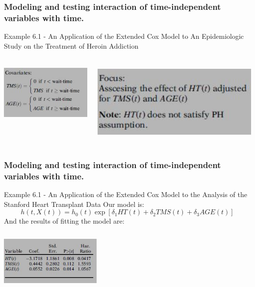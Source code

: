 \documentclass{beamer}
\theoremstyle{definition}
\begin{document}
\begin{frame}
\frametitle{Modeling and testing interaction of time-independent variables with time.}
\begin{block}{Example 6.1 - An Application of the Extended Cox Model to An Epidemiologic Study on the Treatment of Heroin Addiction}
\begin{columns}
    \begin{column}{0.48\textwidth}
        \includegraphics[width =\textwidth, height=3cm]{CH6_transp2.JPG}
    \end{column}
    \hspace{-10pt}
    \begin{column}{0.48\textwidth}
         \includegraphics[width =\textwidth, height=4cm]{CH6_transp3.JPG}
    \end{column}
\end{columns}
\end{block}
\end{frame}

\begin{frame}
\frametitle{Modeling and testing interaction of time-independent variables with time.}
\begin{block}{Example 6.1 - An Application of the Extended Cox Model to the Analysis of the Stanford Heart Transplant Data}
Our model is:
\[
h(t,X(t))= h_0(t) \exp[\delta_1 HT(t) + \delta_2 TMS(t) + \delta_3 AGE(t)]
\]
And the results of fitting the model are:
\begin{center}
 \includegraphics[width = 5cm, height=3cm]{CH6_trnsp4}
 \end{center}
\end{block}
\end{frame}
\end{document}
